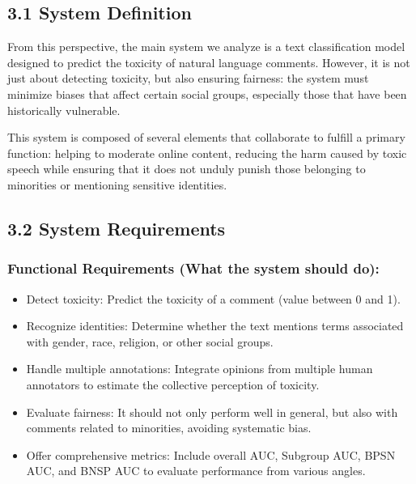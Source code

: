 \documentclass[a4paper,12pt]{article}
\begin{document}
\subsection*{3.1 System Definition}

From this perspective, the main system we analyze is a text classification model designed to predict the toxicity of natural language comments. However, it is not just about detecting toxicity, but also ensuring fairness: the system must minimize biases that affect certain social groups, especially those that have been historically vulnerable.

This system is composed of several elements that collaborate to fulfill a primary function: helping to moderate online content, reducing the harm caused by toxic speech while ensuring that it does not unduly punish those belonging to minorities or mentioning sensitive identities.

\subsection*{3.2 System Requirements}

\subsubsection*{Functional Requirements (What the system should do):}
\begin{itemize}
    \item Detect toxicity: Predict the toxicity of a comment (value between 0 and 1).
    \item Recognize identities: Determine whether the text mentions terms associated with gender, race, religion, or other social groups.
    \item Handle multiple annotations: Integrate opinions from multiple human annotators to estimate the collective perception of toxicity.
    \item Evaluate fairness: It should not only perform well in general, but also with comments related to minorities, avoiding systematic bias.
    \item Offer comprehensive metrics: Include overall AUC, Subgroup AUC, BPSN AUC, and BNSP AUC to evaluate performance from various angles.
\end{itemize}
\end{document}
